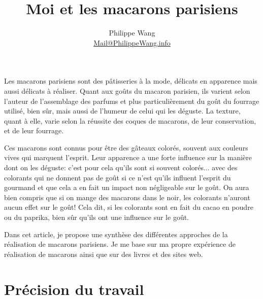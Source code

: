 \documentclass[a4paper]{article}
\title{Moi et les macarons parisiens}
\author{Philippe \sc Wang\\\href{mailto:mail@philippewang.info}{\sc\small Mail@PhilippeWang.info}}
\begin{document}
\maketitle
{}

Les macarons  parisiens sont  des pâtisseries à  la mode,  délicats en
apparence mais aussi délicats à  réaliser.  Quant aux goûts du macaron
parisien, ils  varient selon l'auteur  de l'assemblage des  parfums et
plus  particulièrement du  goût du  fourrage utilisé,  bien  sûr, mais
aussi de l'humeur de celui qui les déguste.  La texture, quant à elle,
varie selon la réussite des  coques de macarons, de leur conservation,
et de leur fourrage. %


Ces macarons  sont connus pour  être des gâteaux colorés,  souvent aux
couleurs  vives qui  marquent  l'esprit. Leur  apparence  a une  forte
influence sur la  manière dont on les déguste:  c'est pour cela qu'ils
sont si  souvent colorés... avec des  colorants qui ne  donnent pas de
goût si ce n'est qu'ils influent l'esprit du gourmand et que cela a en
fait un impact non négligeable sur  le goût.  On aura bien compris que
si on  mange des macarons dans  le noir, les  colorants n'auront aucun
effet sur le  goût!  Cela dit, si les colorants sont  en fait du cacao
en poudre  ou du  paprika, bien  sûr qu'ils ont  une influence  sur le
goût.

Dans cet article, je propose une synthèse des différentes approches de
la  réalisation de  macarons  parisiens.   Je me  base  sur ma  propre
expérience de réalisation de macarons  ainsi que sur des livres et des
sites web.

\section{Précision du travail}
\end{document}

